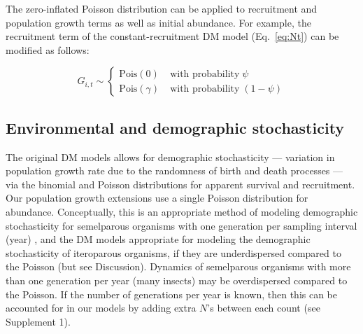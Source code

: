 \documentclass[12pt,english]{article}
\begin{document}
\begin{spacing}{1.9}
\begin{flushleft}
The zero-inflated Poisson distribution can be applied to recruitment and 
population growth terms as well as initial abundance. For example, 
the recruitment term of the constant-recruitment DM model
(Eq.~\ref{eq:Nt}) can be modified as follows:
\begin{linenomath*}
\begin{equation}
G_{i,t} \sim \left\{
\begin{aligned}
\mathrm{Pois}(0) &\; \text{with probability} \; \psi \\
\mathrm{Pois}(\gamma) &\; \text{with probability} \; (1-\psi)\end{aligned} \right.
\label{eq:ZIPts}
\end{equation}
\end{linenomath*}

\subsection*{Environmental and demographic stochasticity}

The original DM models allows for demographic stochasticity --- variation in population growth 
rate due to the randomness of birth and death processes --- 
via the binomial and Poisson distributions for apparent survival and recruitment.  Our population
growth extensions use a single Poisson distribution for abundance. 
Conceptually, this is an appropriate method of modeling demographic stochasticity 
 for semelparous organisms with one generation per sampling interval (year)
 \citep{bonsall_hastings:2004},
and the DM models appropriate for modeling the demographic stochasticity of iteroparous organisms,
if they are underdispersed compared to the Poisson (but see Discussion).
 Dynamics of semelparous organisms with more than one generation per year 
 (many insects) may be overdispersed compared to the Poisson.  If the number of generations per
 year is known, then this can be accounted for in our models by adding extra $N$'s between each
 count (see Supplement 1).


\end{flushleft}
\end{spacing}
\end{document}
